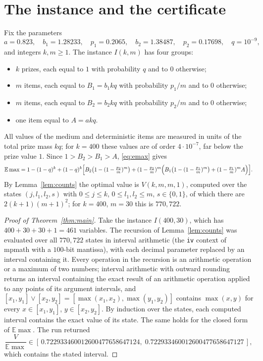 \documentclass[11pt]{amsart}
\theoremstyle{remark}\newtheorem{remark}[theorem]{Remark}
\newcommand{\E}{\mathbb{E}}
\begin{document}
\section{The instance and the certificate}\label{sec:cert}

Fix the parameters
\[
a=0.823,\quad b_1=1.28233,\quad p_1=0.2065,\quad b_2=1.38487,\quad p_2=0.17698,\quad q=10^{-9},
\]
and integers $k,m\ge1$. The instance $I(k,m)$ has four groups:
\begin{itemize}
\item $k$ prizes, each equal to $1$ with probability $q$ and to $0$ otherwise;
\item $m$ items, each equal to $B_1=b_1kq$ with probability $p_1/m$ and to $0$ otherwise;
\item $m$ items, each equal to $B_2=b_2kq$ with probability $p_2/m$ and to $0$ otherwise;
\item one item equal to $A=akq$.
\end{itemize}
All values of the medium and deterministic items are measured in units of the total prize mass $kq$; for $k=400$ these
values are of order $4\cdot10^{-7}$, far below the prize value $1$. Since $1>B_2>B_1>A$, \eqref{eq:emax} gives
\[
\E\max=1-(1-q)^k+(1-q)^k\Bigl[B_2\bigl(1-(1-\tfrac{p_2}{m})^m\bigr)+(1-\tfrac{p_2}{m})^m\Bigl(B_1\bigl(1-(1-\tfrac{p_1}{m})^m\bigr)
+(1-\tfrac{p_1}{m})^mA\Bigr)\Bigr].
\]
By Lemma~\ref{lem:counts} the optimal value is $V(k,m,m,1)$, computed over the states $(j,l_1,l_2,s)$ with
$0\le j\le k$, $0\le l_1,l_2\le m$, $s\in\{0,1\}$, of which there are $2(k+1)(m+1)^2$; for $k=400$, $m=30$ this is
$770{,}722$.

\begin{proof}[Proof of Theorem~\ref{thm:main}]
Take the instance $I(400,30)$, which has $400+30+30+1=461$ variables. The recursion of Lemma~\ref{lem:counts} was
evaluated over all $770{,}722$ states in interval arithmetic (the \texttt{iv} context of mpmath with a $100$-bit
mantissa), with each decimal parameter replaced by an interval containing it. Every operation in the recursion is an
arithmetic operation or a maximum of two numbers; interval arithmetic with outward rounding returns an interval
containing the exact result of an arithmetic operation applied to any points of its argument intervals, and
$[x_1,y_1]\vee[x_2,y_2]=[\max(x_1,x_2),\max(y_1,y_2)]$ contains $\max(x,y)$ for every $x\in[x_1,y_1]$, $y\in[x_2,y_2]$.
By induction over the states, each computed interval contains the exact value of its state. The same holds for the
closed form of $\E\max$. The run returned
\[
\frac{V}{\E\max}\in[\,0.722933460012600477658647124,\;0.722933460012600477658647127\,],
\]
which contains the stated interval.
\end{proof}
\end{document}
